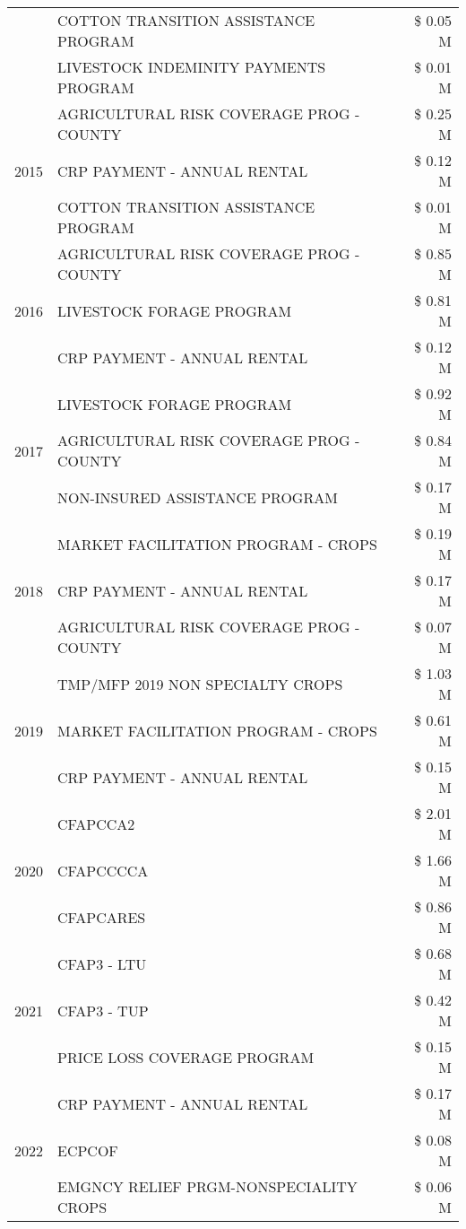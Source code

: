 \begin{tabular}{llr}
 & COTTON TRANSITION ASSISTANCE PROGRAM & \$ 0.05 M \\
 & LIVESTOCK INDEMINITY PAYMENTS PROGRAM & \$ 0.01 M \\
\cline{1-3}
\multirow[t]{3}{*}{2015} & AGRICULTURAL RISK COVERAGE PROG - COUNTY & \$ 0.25 M \\
 & CRP PAYMENT - ANNUAL RENTAL & \$ 0.12 M \\
 & COTTON TRANSITION ASSISTANCE PROGRAM & \$ 0.01 M \\
\cline{1-3}
\multirow[t]{3}{*}{2016} & AGRICULTURAL RISK COVERAGE PROG - COUNTY & \$ 0.85 M \\
 & LIVESTOCK FORAGE PROGRAM & \$ 0.81 M \\
 & CRP PAYMENT - ANNUAL RENTAL & \$ 0.12 M \\
\cline{1-3}
\multirow[t]{3}{*}{2017} & LIVESTOCK FORAGE PROGRAM & \$ 0.92 M \\
 & AGRICULTURAL RISK COVERAGE PROG - COUNTY & \$ 0.84 M \\
 & NON-INSURED ASSISTANCE PROGRAM & \$ 0.17 M \\
\cline{1-3}
\multirow[t]{3}{*}{2018} & MARKET FACILITATION PROGRAM - CROPS & \$ 0.19 M \\
 & CRP PAYMENT - ANNUAL RENTAL & \$ 0.17 M \\
 & AGRICULTURAL RISK COVERAGE PROG - COUNTY & \$ 0.07 M \\
\cline{1-3}
\multirow[t]{3}{*}{2019} & TMP/MFP 2019 NON SPECIALTY CROPS & \$ 1.03 M \\
 & MARKET FACILITATION PROGRAM - CROPS & \$ 0.61 M \\
 & CRP PAYMENT - ANNUAL RENTAL & \$ 0.15 M \\
\cline{1-3}
\multirow[t]{3}{*}{2020} & CFAPCCA2 & \$ 2.01 M \\
 & CFAPCCCCA & \$ 1.66 M \\
 & CFAPCARES & \$ 0.86 M \\
\cline{1-3}
\multirow[t]{3}{*}{2021} & CFAP3 - LTU & \$ 0.68 M \\
 & CFAP3 - TUP & \$ 0.42 M \\
 & PRICE LOSS COVERAGE PROGRAM & \$ 0.15 M \\
\cline{1-3}
\multirow[t]{3}{*}{2022} & CRP PAYMENT - ANNUAL RENTAL & \$ 0.17 M \\
 & ECPCOF & \$ 0.08 M \\
 & EMGNCY RELIEF PRGM-NONSPECIALITY CROPS & \$ 0.06 M \\
\cline{1-3}
\bottomrule
\end{tabular}
